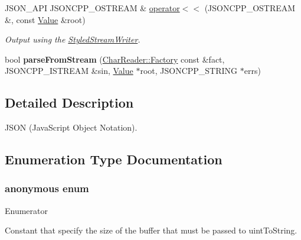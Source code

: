 \begin{DoxyCompactItemize}
\item 
J\+S\+O\+N\+\_\+\+A\+PI J\+S\+O\+N\+C\+P\+P\+\_\+\+O\+S\+T\+R\+E\+AM \& \hyperlink{namespaceJson_a975d1dbca8aa7a06f38d373edcb9081c}{operator$<$$<$} (J\+S\+O\+N\+C\+P\+P\+\_\+\+O\+S\+T\+R\+E\+AM \&, const \hyperlink{classJson_1_1Value}{Value} \&root)
\begin{DoxyCompactList}\small\item\em Output using the \hyperlink{classJson_1_1StyledStreamWriter}{Styled\+Stream\+Writer}. \end{DoxyCompactList}\item 
bool {\bfseries parse\+From\+Stream} (\hyperlink{classJson_1_1CharReader_1_1Factory}{Char\+Reader\+::\+Factory} const \&fact, J\+S\+O\+N\+C\+P\+P\+\_\+\+I\+S\+T\+R\+E\+AM \&sin, \hyperlink{classJson_1_1Value}{Value} $\ast$root, J\+S\+O\+N\+C\+P\+P\+\_\+\+S\+T\+R\+I\+NG $\ast$errs)\hypertarget{namespaceJson_a38f903cfdb57a6c4e86a7dcc42f3712c}{}\label{namespaceJson_a38f903cfdb57a6c4e86a7dcc42f3712c}

\end{DoxyCompactItemize}


\subsection{Detailed Description}
J\+S\+ON (Java\+Script Object Notation). 

\subsection{Enumeration Type Documentation}
\subsubsection[{\texorpdfstring{anonymous enum}{anonymous enum}}]{\setlength{\rightskip}{0pt plus 5cm}anonymous enum}\hypertarget{namespaceJson_a2aacab54ef6fc18e833fbd4982a0a23a}{}\label{namespaceJson_a2aacab54ef6fc18e833fbd4982a0a23a}
\begin{Desc}
\item[Enumerator]\par
\begin{description}
\item[{\em 
uint\+To\+String\+Buffer\+Size\hypertarget{namespaceJson_a2aacab54ef6fc18e833fbd4982a0a23aae4f2008c7919f20d81286121d1374424}{}\label{namespaceJson_a2aacab54ef6fc18e833fbd4982a0a23aae4f2008c7919f20d81286121d1374424}
}]Constant that specify the size of the buffer that must be passed to uint\+To\+String. \end{description}
\end{Desc}
